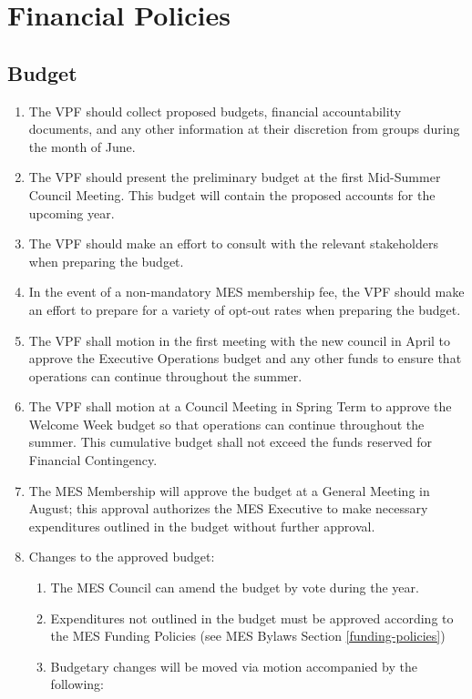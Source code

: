 \section{Financial Policies}
\label{financial-policies}

\subsection{Budget}
\label{budget}
\begin{enumerate}
 \item 
 The VPF should collect proposed budgets, financial accountability documents,
 and any other information at their discretion from groups during the month of
 June.
 \item
  The VPF should present the preliminary budget at the first Mid-Summer Council Meeting. This budget will contain the proposed accounts for the upcoming year.
 \item
  The VPF should make an effort to consult with the relevant stakeholders when preparing the budget.
 \item
  In the event of a non-mandatory MES membership fee, the VPF should make an effort to prepare for a variety of opt-out rates when preparing the budget.
 \item
  The VPF shall motion in the first meeting with the new council in April to
  approve the Executive Operations budget and any other funds to ensure that
  operations can continue throughout the summer.
 \item
  The VPF shall motion at a Council Meeting in Spring Term to approve the Welcome Week budget so that operations can continue throughout the summer. This cumulative budget shall not exceed the funds reserved for Financial Contingency.
 \item
  The MES Membership will approve the budget at a General Meeting in August; this approval authorizes the MES Executive to make necessary expenditures outlined in the budget without further approval.
 \item
  Changes to the approved budget:

  \begin{enumerate}
   \item
    The MES Council can amend the budget by vote during the year.
   \item
    Expenditures not outlined in the budget must be approved according to the MES Funding Policies (see MES Bylaws Section \ref{funding-policies})
   \item
    Budgetary changes will be moved via motion accompanied by the following:


\end{enumerate}
\end{enumerate}
